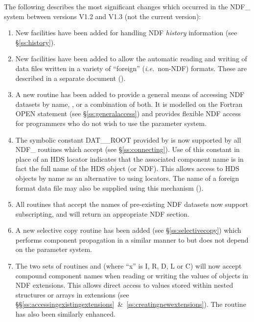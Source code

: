 \documentclass[twoside,11pt,nolof]{starlink}
\providecommand{\st}[1]{{\emph{#1}}}
\begin{document}
The following describes the most significant changes which occurred in
the NDF\_ system between versions V1.2 and V1.3 (not the current
version):

\begin{enumerate}

\item New facilities have been added for handling NDF \st{history\/}
information (see \S\ref{ss:history}).

\item New facilities have been added to allow the automatic reading and writing
of data files written in a variety of ``foreign'' (\st{i.e.}\ non-NDF)
formats. These are described in a separate document
().

\item A new routine  has been added to provide a general
means of accessing NDF datasets by name,
, or a combination of
both. It is modelled on the Fortran OPEN statement (see
\S\ref{ss:generalaccess}) and provides flexible NDF access for
programmers who do not wish to use the  parameter system.

\item The symbolic constant DAT\_\_ROOT provided by  is now
supported by all NDF\_ routines which accept  (see
\S\ref{ss:connecting}). Use of this constant in place of an HDS
locator indicates that the associated component name is in fact the
full name of the HDS object (or NDF). This allows access to HDS
objects by name as an alternative to using locators. The name of a
foreign format data file may also be supplied using this mechanism
().

\item All routines that accept the names of pre-existing NDF datasets now
support subscripting, and will return an appropriate NDF section.

\item A new selective copy routine  has been added (see
\S\ref{ss:selectivecopy}) which performs component propagation in a
similar manner to  but does not depend on the
 parameter system.

\item The two sets of routines  and  (where ``x''
is I, R, D, L or C) will now accept compound component names when
reading or writing the values of objects in NDF extensions. This
allows direct access to values stored within nested structures or
arrays in extensions (see
\S\S\ref{ss:accessingexistingextensions}~\&~\ref{ss:creatingnewextensions}).
The routine  has also been similarly enhanced.


\end{enumerate}
\end{document}
